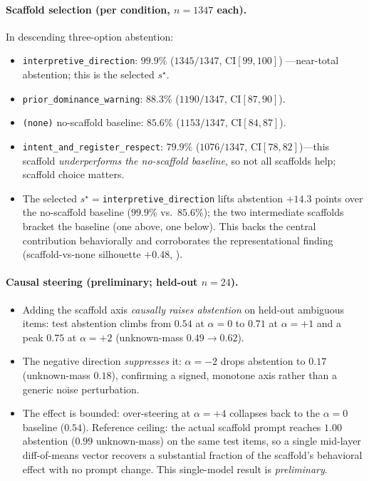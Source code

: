 \paragraph{Scaffold selection (per condition, $n{=}1347$ each).}
In descending three-option abstention:
\begin{itemize}[leftmargin=*,topsep=2pt,itemsep=1pt]
  \item \texttt{interpretive\_direction}: $99.9\%$ ($1345/1347$, CI$[99,100]$)
    ---near-total abstention; this is the selected $s^\star$.
  \item \texttt{prior\_dominance\_warning}: $88.3\%$ ($1190/1347$, CI$[87,90]$).
  \item \texttt{(none)} no-scaffold baseline: $85.6\%$ ($1153/1347$, CI$[84,87]$).
  \item \texttt{intent\_and\_register\_respect}: $79.9\%$ ($1076/1347$,
    CI$[78,82]$)---this scaffold \emph{underperforms the no-scaffold baseline}, so
    not all scaffolds help; scaffold choice matters.
  \item The selected $s^\star{=}$\texttt{interpretive\_direction} lifts abstention
    $+14.3$ points over the no-scaffold baseline ($99.9\%$ vs.\ $85.6\%$); the two
    intermediate scaffolds bracket the baseline (one above, one below). This backs
    the central contribution behaviorally and corroborates the representational
    finding (scaffold-vs-none silhouette $+0.48$, ).
\end{itemize}

\paragraph{Causal steering (preliminary; held-out $n{=}24$).}
\begin{itemize}[leftmargin=*,topsep=2pt,itemsep=1pt]
  \item Adding the scaffold axis \emph{causally raises abstention} on held-out
    ambiguous items: test abstention climbs from $0.54$ at $\alpha{=}0$ to $0.71$
    at $\alpha{=}{+}1$ and a peak $0.75$ at $\alpha{=}{+}2$ (unknown-mass
    $0.49 \to 0.62$).
  \item The negative direction \emph{suppresses} it: $\alpha{=}{-}2$ drops
    abstention to $0.17$ (unknown-mass $0.18$), confirming a signed, monotone axis
    rather than a generic noise perturbation.
  \item The effect is bounded: over-steering at $\alpha{=}{+}4$ collapses back to
    the $\alpha{=}0$ baseline ($0.54$). Reference ceiling: the actual scaffold
    prompt reaches $1.00$ abstention ($0.99$ unknown-mass) on the same test items,
    so a single mid-layer diff-of-means vector recovers a substantial fraction of
    the scaffold's behavioral effect with no prompt change. This single-model
    result is \emph{preliminary}.
\end{itemize}

